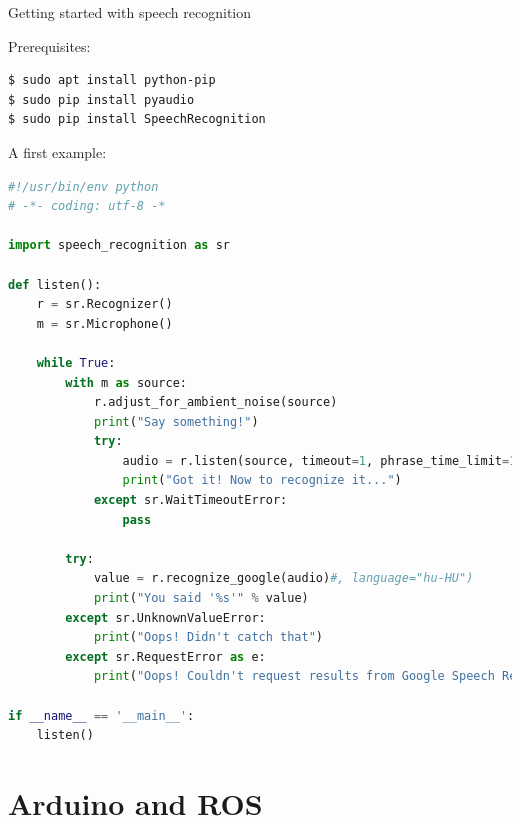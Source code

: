 \begin{frame}{Getting started with speech recognition}

Prerequisites:
\begin{lstlisting}[language=shell]
$ sudo apt install python-pip
$ sudo pip install pyaudio
$ sudo pip install SpeechRecognition
\end{lstlisting}

A first example:
\begin{lstlisting}[language=python]
#!/usr/bin/env python
# -*- coding: utf-8 -*

import speech_recognition as sr

def listen():
    r = sr.Recognizer()
    m = sr.Microphone()

    while True:
        with m as source:
            r.adjust_for_ambient_noise(source)
            print("Say something!")
            try:
                audio = r.listen(source, timeout=1, phrase_time_limit=10)
                print("Got it! Now to recognize it...")
            except sr.WaitTimeoutError:
                pass

        try:
            value = r.recognize_google(audio)#, language="hu-HU")
            print("You said '%s'" % value)
        except sr.UnknownValueError:
            print("Oops! Didn't catch that")
        except sr.RequestError as e:
            print("Oops! Couldn't request results from Google Speech Recognition service; {0}".format(e))

if __name__ == '__main__':
    listen()
\end{lstlisting}

\end{frame}


\section{Arduino and ROS}

